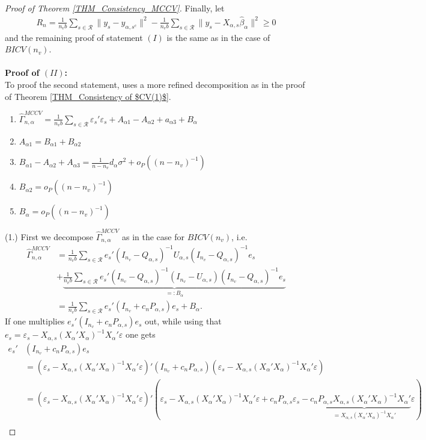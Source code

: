 \documentclass[Research_Module_ES.tex]{subfiles}
\begin{document}
\begin{proof}[Proof of Theorem \ref{THM_Consistency_MCCV}]
	Finally, let
	\begin{align*}
	R_n= \frac{1}{n_vb}\sum_{s\in \mathcal{R}}\lVert y_s-\hat{y}_{\alpha,s^c}\rVert^2- \frac{1}{n_vb}\sum_{s\in \mathcal{R}}\lVert y_s-X_{\alpha,s}\hat{\beta}_\alpha\rVert^2 \ge 0
	\end{align*} 
	and the remaining proof of statement $(I)$ is the same as in the case of $BICV(n_v)$.\\\\
	\textbf{Proof of $(II)$:}\\
	To proof the second statement, \cite{shao} uses a more refined decomposition as in the proof of Theorem \ref{THM_Consistency of $CV(1)$}. 
	\begin{enumerate}
		\item  $\hat{\Gamma}_{n,\alpha}^{MCCV} = \frac{1}{n_vb}\sum_{s\in \mathcal{R}}\varepsilon_s'\varepsilon_s+ A_{\alpha1}-A_{\alpha2}+a_{\alpha3}+B_\alpha$
		\item $A_{\alpha1} = B_{\alpha1}+ B_{\alpha2}$
		\item $ B_{\alpha1}-A_{\alpha2}+A_{\alpha3} = \frac{1}{n-n_v}d_\alpha\sigma^2 + o_P((n-n_v)^{-1})$
		\item $B_{\alpha2} = o_P((n-n_v)^{-1})$
		\item $B_{\alpha} = o_P((n-n_v)^{-1})$
	\end{enumerate}
	(1.)
	First we decompose $\hat{\Gamma}_{n,\alpha}^{MCCV}$ as in the case for $BICV(n_v)$, i.e.
	\begin{align*}
	\hat{\Gamma}_{n,\alpha}^{MCCV} &= \frac{1}{n_vb}\sum_{s\in\mathcal{R}}e_s'(I_{n_v}-Q_{\alpha,s})^{-1}U_{\alpha,s}(I_{n_v}-Q_{\alpha,s})^{-1}e_s\\
	&+\underbrace{\frac{1}{n_vb}\sum_{s\in\mathcal{R}}e_s'(I_{n_v}-Q_{\alpha,s})^{-1}(I_{n_v}-U_{\alpha,s})(I_{n_v}-Q_{\alpha,s})^{-1}e_s}_{=:B_{\alpha}}\\
	&= \frac{1}{n_vb}\sum_{s\in\mathcal{R}}e_s'(I_{n_v}+c_nP_{\alpha,s})e_s + B_\alpha.
	\end{align*}
	If one multiplies $e_s'(I_{n_v}+c_nP_{\alpha,s})e_s$ out, while using that $e_s = \varepsilon_s - X_{\alpha,s}(X_\alpha'X_\alpha)^{-1}X_\alpha'\varepsilon$ one gets
	\begin{align*}
	e_s'&(I_{n_v}+c_nP_{\alpha,s})e_s \\
	&= (\varepsilon_s - X_{\alpha,s}(X_\alpha'X_\alpha)^{-1}X_\alpha'\varepsilon)'(I_{n_v}+c_nP_{\alpha,s})(\varepsilon_s - X_{\alpha,s}(X_\alpha'X_\alpha)^{-1}X_\alpha'\varepsilon)\\
	&= (\varepsilon_s - X_{\alpha,s}(X_\alpha'X_\alpha)^{-1}X_\alpha'\varepsilon)'(\varepsilon_s - X_{\alpha,s}(X_\alpha'X_\alpha)^{-1}X_\alpha'\varepsilon + c_nP_{\alpha,s}\varepsilon_s - c_n\underbrace{P_{\alpha,s}X_{\alpha,s}(X_\alpha'X_\alpha)^{-1}X_\alpha'}_{=X_{\alpha,s}(X_\alpha'X_\alpha)^{-1}X_\alpha'}\varepsilon)\\

\end{align*}
\end{proof}
\end{document}

